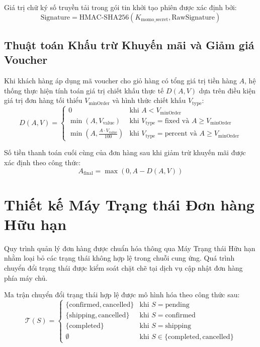 Giá trị chữ ký số truyền tải trong gói tin khởi tạo phiên được xác định bởi:
\begin{equation}
\text{Signature} = \text{HMAC-SHA256}(K_{\text{momo\_secret}}, \text{RawSignature})
\end{equation}

\subsection{Thuật toán Khấu trừ Khuyến mãi và Giảm giá Voucher}
Khi khách hàng áp dụng mã voucher cho giỏ hàng có tổng giá trị tiền hàng $A$, hệ thống thực hiện tính toán giá trị chiết khấu thực tế $D(A, V)$ dựa trên điều kiện giá trị đơn hàng tối thiểu $V_{\text{minOrder}}$ và hình thức chiết khấu $V_{\text{type}}$:
\begin{equation}
D(A, V) = 
\begin{cases} 
0 & \text{khi } A < V_{\text{minOrder}} \\
\min(A, V_{\text{value}}) & \text{khi } V_{\text{type}} = \text{fixed} \text{ và } A \ge V_{\text{minOrder}} \\
\min\left(A, \frac{A \cdot V_{\text{value}}}{100}\right) & \text{khi } V_{\text{type}} = \text{percent} \text{ và } A \ge V_{\text{minOrder}}
\end{cases}
\end{equation}

Số tiền thanh toán cuối cùng của đơn hàng sau khi giảm trừ khuyến mãi được xác định theo công thức:
\begin{equation}
A_{\text{final}} = \max(0, A - D(A, V))
\end{equation}

\section{Thiết kế Máy Trạng thái Đơn hàng Hữu hạn}
Quy trình quản lý đơn hàng được chuẩn hóa thông qua Máy Trạng thái Hữu hạn nhằm loại bỏ các trạng thái không hợp lệ trong chuỗi cung ứng. Quá trình chuyển đổi trạng thái được kiểm soát chặt chẽ tại dịch vụ cập nhật đơn hàng phía máy chủ.

Ma trận chuyển đổi trạng thái hợp lệ được mô hình hóa theo công thức sau:
\begin{equation}
\mathcal{T}(S) = 
\begin{cases} 
\{\text{confirmed}, \text{cancelled}\} & \text{khi } S = \text{pending} \\
\{\text{shipping}, \text{cancelled}\} & \text{khi } S = \text{confirmed} \\
\{\text{completed}\} & \text{khi } S = \text{shipping} \\
\emptyset & \text{khi } S \in \{\text{completed}, \text{cancelled}\}
\end{cases}
\end{equation}

